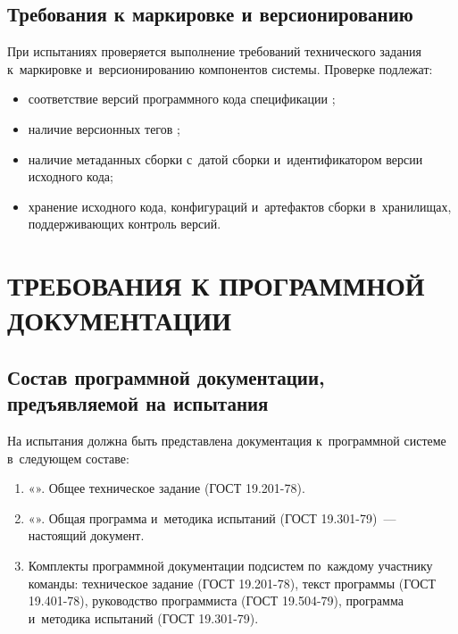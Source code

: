 \documentclass[12pt,a4paper]{extarticle}
\begin{document}
\subsection{Требования к маркировке и версионированию}

\begin{hseExample}
При испытаниях проверяется выполнение требований технического задания к~маркировке и~версионированию компонентов системы. Проверке подлежат:

\begin{itemize}[leftmargin=1.25cm]
    \item соответствие версий программного кода спецификации ;
    \item наличие версионных тегов ;
    \item наличие метаданных сборки с~датой сборки и~идентификатором версии исходного кода;
    \item хранение исходного кода, конфигураций и~артефактов сборки в~хранилищах, поддерживающих контроль версий.
\end{itemize}
\end{hseExample}

\clearpage

\section{ТРЕБОВАНИЯ К ПРОГРАММНОЙ ДОКУМЕНТАЦИИ}

\subsection{Состав программной документации, предъявляемой на испытания}


На испытания должна быть представлена документация к~программной системе в~следующем составе:
\begin{enumerate}[label=\arabic*), leftmargin=1.25cm]
    \item «\projectname». Общее техническое задание (ГОСТ 19.201-78).
    \item «\projectname». Общая программа и~методика испытаний
          (ГОСТ 19.301-79)~--- настоящий документ.
    \item Комплекты программной документации подсистем по~каждому
          участнику команды: техническое задание (ГОСТ 19.201-78),
          текст программы (ГОСТ 19.401-78), руководство программиста
          (ГОСТ 19.504-79), программа и~методика испытаний
          (ГОСТ 19.301-79).
\end{enumerate}
\end{document}
